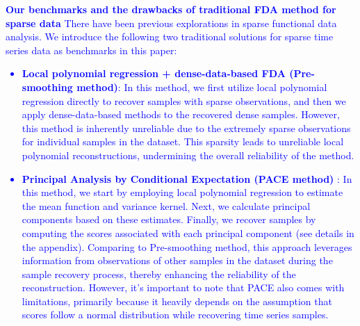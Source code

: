 \documentclass{article}
\begin{document}
\textcolor{blue}{
\textbf{Our benchmarks and the drawbacks of traditional FDA method for sparse data}
There have been previous explorations in sparse functional data analysis. 
We introduce the following two traditional solutions for sparse time series data as benchmarks in this paper:
\begin{itemize}
  \item \textbf{Local polynomial regression + dense-data-based FDA (Pre-smoothing method)}: 
  In this method, we first utilize local polynomial regression directly to recover samples with sparse observations, 
  and then we apply dense-data-based methods to the recovered dense samples. 
  However, this method is inherently unreliable due to the extremely sparse observations for individual samples in the dataset. 
  This sparsity leads to unreliable local polynomial reconstructions, 
  undermining the overall reliability of the method.
  \item \textbf{Principal Analysis by Conditional Expectation (PACE method) }\cite{yao2005functional}: 
  In this method, we start by employing local polynomial regression to estimate the mean function and variance kernel. 
  Next, we calculate principal components based on these estimates. 
  Finally, we recover samples by computing the scores associated with each principal component (see details in the appendix).
  Comparing to Pre-smoothing method, this approach leverages information from observations of other samples in the dataset during the sample recovery process, 
  thereby enhancing the reliability of the reconstruction. 
  However, it's important to note that PACE also comes with limitations, primarily because it heavily depends on the assumption that scores follow a normal distribution while recovering time series samples.
\end{itemize}
}
\end{document}
